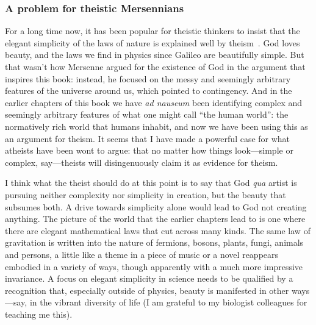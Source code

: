 \subsubsection{A problem for theistic Mersennians}
For a long time now, it has been popular for theistic thinkers to insist that the elegant simplicity of the laws of nature 
is explained well by theism~. God loves beauty, and the laws we find in physics since Galileo are beautifully simple.
But that wasn't how Mersenne argued for the existence of God in the argument that inspires this book: 
instead, he focused on the messy and seemingly arbitrary features of the universe
around us, which pointed to contingency. And in the earlier chapters of this book we have 
\textit{ad nauseum} been identifying complex and seemingly arbitrary features of what one might call ``the human world'': 
the normatively rich world that humans inhabit, and now we have been using this as an argument for theism. It seems that I have made a powerful case for what atheists have been wont to argue: that no matter how things look---simple or complex, say---theists will disingenuously claim it as evidence for theism.

I think what the theist should do at this point is to say that God \textit{qua} artist is pursuing neither complexity nor simplicity 
in creation, but the beauty that subsumes both. A drive towards simplicity alone would lead to God not creating anything. 
The picture of the world that the earlier chapters lead to is one where there 
are elegant mathematical laws that cut across many kinds. The same law of gravitation is written into the nature of fermions, bosons, plants, fungi, animals and persons, a little like a theme in a piece of music or a novel reappears embodied in a variety 
of ways, though apparently with a much more impressive invariance. A focus on elegant simplicity in science needs to be qualified 
by a recognition that, especially outside of physics, beauty is manifested in other ways---say, in the vibrant diversity of 
life (I am grateful to my biologist colleagues for teaching me this). 

